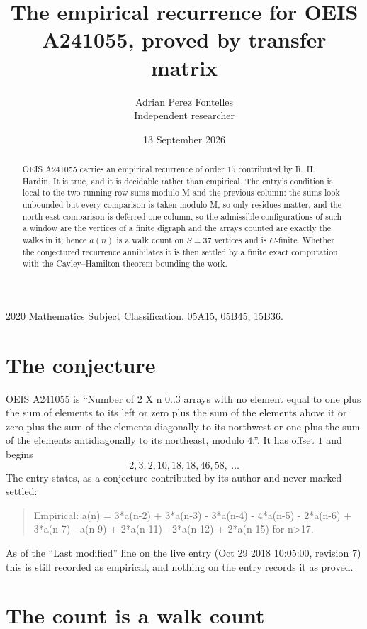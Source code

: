 \documentclass[11pt,a4paper]{article}
\title{The empirical recurrence for OEIS A241055, proved by transfer matrix}
\author{Adrian Perez Fontelles\\ \small Independent researcher}
\date{13 September 2026}
\theoremstyle{plain}
\theoremstyle{definition}
\begin{document}
\maketitle

\begin{abstract}
OEIS A241055 carries an empirical recurrence of order $15$ contributed by R. H. Hardin. It is
true, and it is decidable rather than empirical. The entry's condition is local to the two running row sums modulo M and the previous column: the sums look unbounded but every comparison is taken modulo M, so only residues matter, and the north-east comparison is deferred one column, so
the admissible configurations of such a window are the vertices of a finite digraph and the
arrays counted are exactly the walks in it; hence $a(n)$ is a walk count on $S=37$ vertices
and is $C$-finite. Whether the conjectured recurrence annihilates it is then settled by a
finite exact computation, with the Cayley--Hamilton theorem bounding the work.
\end{abstract}

\noindent\small 2020 Mathematics Subject Classification. 05A15, 05B45, 15B36.\normalsize

\section{The conjecture}

OEIS A241055 is ``Number of 2 X n 0..3 arrays with no element equal to one plus the sum of elements to its left or zero plus the sum of the elements above it or zero plus the sum of the elements diagonally to its northwest or one plus the sum of the elements antidiagonally to its northeast, modulo 4.''. It has offset $1$ and begins
\[
2, 3, 2, 10, 18, 18, 46, 58,\ \dots
\]
The entry states, as a conjecture contributed by its author and never marked settled:
\begin{quote}
Empirical: a(n) = 3*a(n-2) + 3*a(n-3) - 3*a(n-4) - 4*a(n-5) - 2*a(n-6) + 3*a(n-7) - a(n-9) + 2*a(n-11) - 2*a(n-12) + 2*a(n-15) for n>17.
\end{quote}
As of the ``Last modified'' line on the live entry (Oct 29 2018 10:05:00, revision 7) this is still
recorded as empirical, and nothing on the entry records it as proved.

\section{The count is a walk count}
\end{document}
